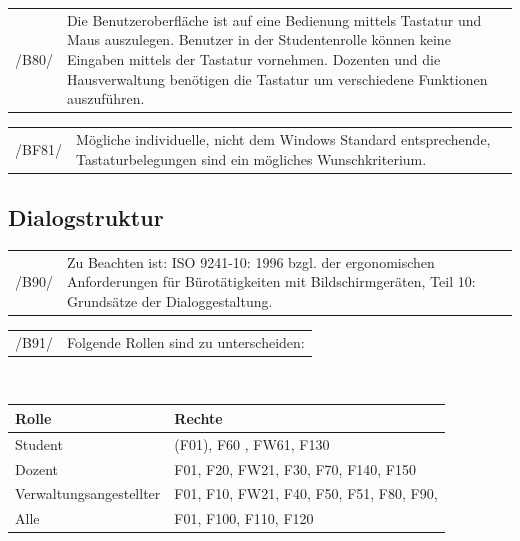 \begin{tabular}{p{1.5cm}p{14.5cm}}
 /B80/	& Die Benutzeroberfläche ist auf eine Bedienung mittels Tastatur und Maus auszulegen. Benutzer in der Studentenrolle können keine Eingaben mittels der Tastatur vornehmen. Dozenten und die Hausverwaltung benötigen die Tastatur um verschiedene Funktionen auszuführen. \\[0.25cm]	 
\end{tabular}

\begin{tabular}{p{1.5cm}p{14.5cm}}
 /BF81/	& Mögliche individuelle, nicht dem Windows Standard entsprechende, Tastaturbelegungen sind ein mögliches  Wunschkriterium. \\[0.25cm]	 
\end{tabular}


\subsection{Dialogstruktur}

\begin{tabular}{p{1.5cm}p{14.5cm}}
 /B90/	& Zu Beachten ist: ISO 9241-10: 1996 bzgl. der ergonomischen Anforderungen für Bürotätigkeiten mit Bildschirmgeräten, Teil 10: Grundsätze der Dialoggestaltung. \\[0.25cm]	 
\end{tabular}

\begin{tabular}{p{1.5cm}p{14.5cm}}
 /B91/	& Folgende Rollen sind zu unterscheiden: \\[0.25cm]	 
\end{tabular}\\


\begin{table}[H]
\begin{tabular}{l|l}
Rolle&Rechte\\
\hline
\hline
Student & (F01), F60 , FW61, F130 \\
\hline
Dozent & F01, F20, FW21, F30, F70, F140, F150  \\
\hline
Verwaltungsangestellter & F01, F10, FW21, F40, F50, F51, F80, F90,  \\
\hline
Alle & F01, F100, F110, F120
\end{tabular}
\end{table}

